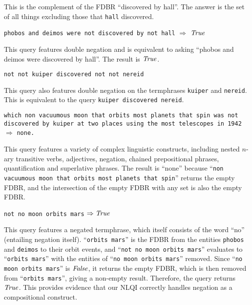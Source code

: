\documentclass[../main.tex]{subfiles}
\begin{document}
\begin{refsection}
\examplespacing

\noindent This is the complement of the FDBR ``discovered by hall''.  The answer is the set of all things excluding those that \texttt{hall} discovered.

\examplespacing

\texttt{phobos and deimos were not discovered by not hall} $\Rightarrow$ $\operatorname{\mathit{True}}$

\examplespacing

\noindent This query features double negation and is equivalent to asking ``phobos and deimos were discovered by hall''.  The result is $\operatorname{\mathit{True}}$.

\examplespacing

\texttt{not not kuiper discovered not not nereid}

\examplespacing

\noindent This query also features double negation on the termphrases \texttt{kuiper} and \texttt{nereid}.
This is equivalent to the query \texttt{kuiper discovered nereid}.

\examplespacing

\texttt{which non vacuumous moon that orbits most planets that spin was not discovered by kuiper at two places using the most telescopes in 1942} $\Rightarrow$ \texttt{none.}

\examplespacing

\noindent This query features a variety of complex linguistic constructs, including nested $n$-ary transitive verbs, adjectives, negation, chained prepositional phrases, quantification and superlative phrases.  The result is ``none'' because ``\texttt{non vacuumous moon that orbits most planets that spin}'' returns the empty FDBR, and the intersection of the empty FDBR with any set is also the empty FDBR.

\examplespacing

\texttt{not no moon orbits mars} $\Rightarrow \operatorname{\mathit{True}}$

\examplespacing

\noindent This query features a negated termphrase, which itself consists of the word ``no'' (entailing negation itself). ``\texttt{orbits mars}'' is the FDBR from the entities \texttt{phobos} and \texttt{deimos} to their orbit events, and ``\texttt{not no moon orbits mars}'' evaluates to ``\texttt{orbits mars}'' with the entities of ``\texttt{no moon orbits mars}'' removed.  Since ``\texttt{no moon orbits mars}'' is $\operatorname{\mathit{False}}$, it returns the empty FDBR, which is then removed from ``\texttt{orbits mars}'', giving a non-empty result.  Therefore, the query returns $\operatorname{\mathit{True}}$. This provides evidence that our NLQI correctly handles negation as a compositional construct.


\end{refsection}
\end{document}
